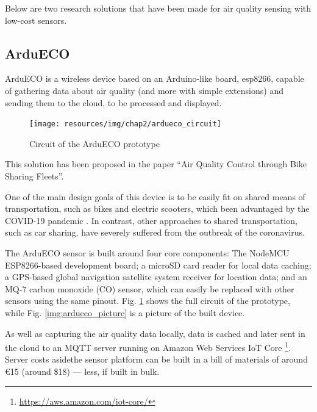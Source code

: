 		Below are two research solutions that have been made for air quality sensing with low-cost sensors.
			
		\subsection{ArduECO}\label{subsec:ardueco}
			
			ArduECO is a wireless device based on an Arduino-like board, esp8266, capable of gathering data about air quality (and more with simple extensions) and sending them to the cloud, to be processed and displayed.

			\begin{figure}
				\centering
				\texttt{[image: resources/img/chap2/ardueco\_circuit]}
				\caption{Circuit of the ArduECO prototype}
				\label{img:ardueco_circuit}
			\end{figure}
			
			This solution has been proposed in the paper ``Air Quality Control through Bike Sharing Fleets''\cite{ardueco_paper}.
			
			One of the main design goals of this device is to be easily fit on shared means of transportation, such as bikes and electric scooters, which been advantaged by the COVID-19 pandemic \cite{HU2021102997}.
			In contrast, other approaches to shared transportation, such as car sharing, have severely suffered from the outbreak of the coronavirus.
			
			The ArduECO sensor is built around four core components: The NodeMCU ESP8266-based development board; a microSD card reader for local data caching; a GPS-based global navigation satellite system receiver for location data; and an MQ-7 carbon monoxide (CO) sensor, which can easily be replaced with other sensors using the same pinout.
			Fig. \ref{img:ardueco_circuit} shows the full circuit of the prototype, while Fig. \ref{img:ardueco_picture} is a picture of the built device.
			
			As well as capturing the air quality data locally, data is cached and later sent in the cloud to an MQTT server running on Amazon Web Services IoT Core \footnote{\url{https://aws.amazon.com/iot-core/}}.
			Server costs asidethe sensor platform can be built in a bill of materials of around €15 (around \$18) — less, if built in bulk.
			
